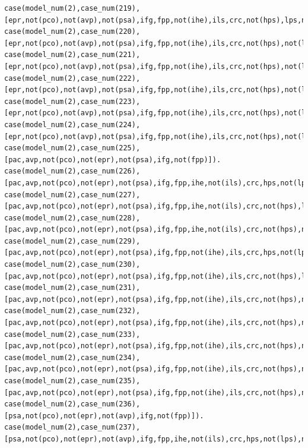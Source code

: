 \documentclass{IOS-Book-Article}
\begin{document}
\begin{lstlisting}
case(model_num(2),case_num(219),[epr,not(pco),not(avp),not(psa),ifg,fpp,not(ihe),ils,crc,not(hps),lps,not(m3fti),not(l3fti),not(cdt),not(fin)]).
case(model_num(2),case_num(220),[epr,not(pco),not(avp),not(psa),ifg,fpp,not(ihe),ils,crc,not(hps),not(lps),not(m3fti),not(l3fti),not(cdt),fin]).
case(model_num(2),case_num(221),[epr,not(pco),not(avp),not(psa),ifg,fpp,not(ihe),ils,crc,not(hps),not(lps),not(m3fti),l3fti,not(cdt),fin,cpb,pbt]).
case(model_num(2),case_num(222),[epr,not(pco),not(avp),not(psa),ifg,fpp,not(ihe),ils,crc,not(hps),not(lps),not(m3fti),not(l3fti),cdt,fin,cpb,pbt]).
case(model_num(2),case_num(223),[epr,not(pco),not(avp),not(psa),ifg,fpp,not(ihe),ils,crc,not(hps),not(lps),not(m3fti),l3fti,not(cdt),fin,not(cpb),not(pbt)]).
case(model_num(2),case_num(224),[epr,not(pco),not(avp),not(psa),ifg,fpp,not(ihe),ils,crc,not(hps),not(lps),not(m3fti),not(l3fti),cdt,fin,not(cpb),not(pbt)]).
case(model_num(2),case_num(225),[pac,avp,not(pco),not(epr),not(psa),ifg,not(fpp)]).
case(model_num(2),case_num(226),[pac,avp,not(pco),not(epr),not(psa),ifg,fpp,ihe,not(ils),crc,hps,not(lps),not(m3fti),not(l3fti),not(cdt),not(fin)]).
case(model_num(2),case_num(227),[pac,avp,not(pco),not(epr),not(psa),ifg,fpp,ihe,not(ils),crc,not(hps),lps,not(m3fti),not(l3fti),not(cdt),not(fin)]).
case(model_num(2),case_num(228),[pac,avp,not(pco),not(epr),not(psa),ifg,fpp,ihe,not(ils),crc,not(hps),not(lps),m3fti,not(l3fti),not(cdt),fin]).
case(model_num(2),case_num(229),[pac,avp,not(pco),not(epr),not(psa),ifg,fpp,not(ihe),ils,crc,hps,not(lps),not(m3fti),not(l3fti),not(cdt),not(fin)]).
case(model_num(2),case_num(230),[pac,avp,not(pco),not(epr),not(psa),ifg,fpp,not(ihe),ils,crc,not(hps),lps,not(m3fti),not(l3fti),not(cdt),not(fin)]).
case(model_num(2),case_num(231),[pac,avp,not(pco),not(epr),not(psa),ifg,fpp,not(ihe),ils,crc,not(hps),not(lps),not(m3fti),not(l3fti),not(cdt),fin]).
case(model_num(2),case_num(232),[pac,avp,not(pco),not(epr),not(psa),ifg,fpp,not(ihe),ils,crc,not(hps),not(lps),not(m3fti),l3fti,not(cdt),fin,cpb,pbt]).
case(model_num(2),case_num(233),[pac,avp,not(pco),not(epr),not(psa),ifg,fpp,not(ihe),ils,crc,not(hps),not(lps),not(m3fti),not(l3fti),cdt,fin,cpb,pbt]).
case(model_num(2),case_num(234),[pac,avp,not(pco),not(epr),not(psa),ifg,fpp,not(ihe),ils,crc,not(hps),not(lps),not(m3fti),l3fti,not(cdt),fin,not(cpb),not(pbt)]).
case(model_num(2),case_num(235),[pac,avp,not(pco),not(epr),not(psa),ifg,fpp,not(ihe),ils,crc,not(hps),not(lps),not(m3fti),not(l3fti),cdt,fin,not(cpb),not(pbt)]).
case(model_num(2),case_num(236),[psa,not(pco),not(epr),not(avp),ifg,not(fpp)]).
case(model_num(2),case_num(237),[psa,not(pco),not(epr),not(avp),ifg,fpp,ihe,not(ils),crc,hps,not(lps),not(m3fti),not(l3fti),not(cdt),not(fin)]).

\end{lstlisting}
\end{document}
